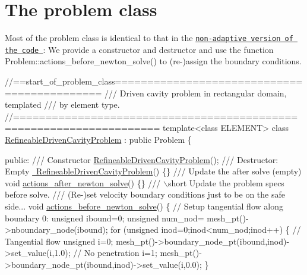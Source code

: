  

\hypertarget{index_problem}{}\section{The problem class}\label{index_problem}
Most of the problem class is identical to that in the \href{../../driven_cavity/html/index.html#problem}{\tt non-\/adaptive version of the code }\+: We provide a constructor and destructor and use the function {\ttfamily Problem\+::actions\+\_\+before\+\_\+newton\+\_\+solve()} to (re-\/)assign the boundary conditions.

 
\begin{DoxyCodeInclude}
\textcolor{comment}{//==start\_of\_problem\_class============================================}
\textcolor{comment}{/// Driven cavity problem in rectangular domain, templated}
\textcolor{comment}{}\textcolor{comment}{/// by element type. }
\textcolor{comment}{}\textcolor{comment}{//====================================================================}
\textcolor{keyword}{template}<\textcolor{keyword}{class} ELEMENT>
\textcolor{keyword}{class }\hyperlink{classRefineableDrivenCavityProblem}{RefineableDrivenCavityProblem} : \textcolor{keyword}{public} Problem
\{

\textcolor{keyword}{public}:
\textcolor{comment}{}
\textcolor{comment}{ /// Constructor}
\textcolor{comment}{} \hyperlink{classRefineableDrivenCavityProblem_aef71ddbff081a1f9c7f5484a6c80598a}{RefineableDrivenCavityProblem}();
\textcolor{comment}{}
\textcolor{comment}{ /// Destructor: Empty}
\textcolor{comment}{} \hyperlink{classRefineableDrivenCavityProblem_a7d90594e973d54ee79a11fff828e124b}{~RefineableDrivenCavityProblem}() \{\}
\textcolor{comment}{}
\textcolor{comment}{ /// Update the after solve (empty)}
\textcolor{comment}{} \textcolor{keywordtype}{void} \hyperlink{classRefineableDrivenCavityProblem_a168df1ad7b08cf8b760b6d56e9920479}{actions\_after\_newton\_solve}() \{\}
\textcolor{comment}{}
\textcolor{comment}{ /// \(\backslash\)short Update the problem specs before solve. }
\textcolor{comment}{ /// (Re-)set velocity boundary conditions just to be on the safe side...}
\textcolor{comment}{} \textcolor{keywordtype}{void} \hyperlink{classRefineableDrivenCavityProblem_af83cad4653c7ac633538ebf46657659a}{actions\_before\_newton\_solve}()
  \{ 
  \textcolor{comment}{// Setup tangential flow along boundary 0:}
  \textcolor{keywordtype}{unsigned} ibound=0; 
  \textcolor{keywordtype}{unsigned} num\_nod= mesh\_pt()->nboundary\_node(ibound);
  \textcolor{keywordflow}{for} (\textcolor{keywordtype}{unsigned} inod=0;inod<num\_nod;inod++)
   \{
    \textcolor{comment}{// Tangential flow}
    \textcolor{keywordtype}{unsigned} i=0;
    mesh\_pt()->boundary\_node\_pt(ibound,inod)->set\_value(i,1.0);
    \textcolor{comment}{// No penetration}
    i=1;
    mesh\_pt()->boundary\_node\_pt(ibound,inod)->set\_value(i,0.0);
   \}
  

\end{DoxyCodeInclude}

